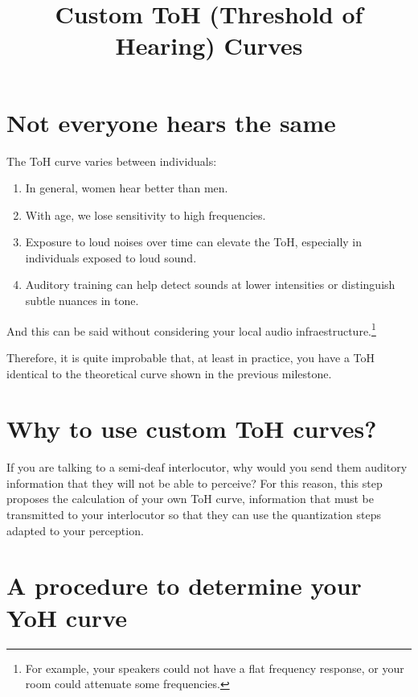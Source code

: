 
\title{Custom ToH (Threshold of Hearing) Curves}

\maketitle
\tableofcontents

\section{Not everyone hears the same}

The ToH curve varies between individuals:
\begin{enumerate}
\item In general, women hear better than men.
\item With age, we lose sensitivity to high frequencies.
\item Exposure to loud noises over time can elevate the ToH,
  especially in individuals exposed to loud sound.
\item Auditory training can help detect sounds at lower intensities or
  distinguish subtle nuances in tone.
\end{enumerate}

And this can be said without considering your local audio
infraestructure.\footnote{For example,
  your speakers could not have a flat frequency response, or your room
  could attenuate some frequencies.}

Therefore, it is quite improbable that, at least in practice, you
have a ToH identical to the theoretical curve shown in the previous
milestone.

\section{Why to use custom ToH curves?}

If you are talking to a semi-deaf interlocutor, why would you send
them auditory information that they will not be able to perceive? For
this reason, this step proposes the calculation of your own ToH curve,
information that must be transmitted to your interlocutor so that they
can use the quantization steps adapted to your perception.

\section{A procedure to determine your YoH curve}

